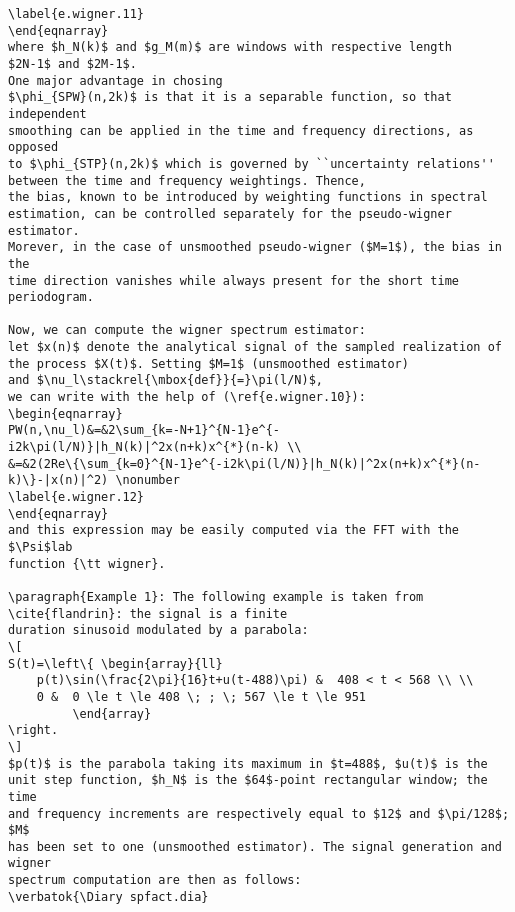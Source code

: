 {\begin{verbatim}
\label{e.wigner.11}
\end{eqnarray}
where $h_N(k)$ and $g_M(m)$ are windows with respective length 
$2N-1$ and $2M-1$.
One major advantage in chosing 
$\phi_{SPW}(n,2k)$ is that it is a separable function, so that independent 
smoothing can be applied in the time and frequency directions, as opposed 
to $\phi_{STP}(n,2k)$ which is governed by ``uncertainty relations'' 
between the time and frequency weightings. Thence, 
the bias, known to be introduced by weighting functions in spectral 
estimation, can be controlled separately for the pseudo-wigner estimator. 
Morever, in the case of unsmoothed pseudo-wigner ($M=1$), the bias in the 
time direction vanishes while always present for the short time periodogram. 

Now, we can compute the wigner spectrum estimator:
let $x(n)$ denote the analytical signal of the sampled realization of 
the process $X(t)$. Setting $M=1$ (unsmoothed estimator) 
and $\nu_l\stackrel{\mbox{def}}{=}\pi(l/N)$, 
we can write with the help of (\ref{e.wigner.10}): 
\begin{eqnarray}
PW(n,\nu_l)&=&2\sum_{k=-N+1}^{N-1}e^{-i2k\pi(l/N)}|h_N(k)|^2x(n+k)x^{*}(n-k) \\
&=&2(2Re\{\sum_{k=0}^{N-1}e^{-i2k\pi(l/N)}|h_N(k)|^2x(n+k)x^{*}(n-k)\}-|x(n)|^2) \nonumber
\label{e.wigner.12}
\end{eqnarray}
and this expression may be easily computed via the FFT with the $\Psi$lab 
function {\tt wigner}.

\paragraph{Example 1}: The following example is taken from \cite{flandrin}: the signal is a finite 
duration sinusoid modulated by a parabola:
\[
S(t)=\left\{ \begin{array}{ll}
	p(t)\sin(\frac{2\pi}{16}t+u(t-488)\pi) &  408 < t < 568 \\ \\
	0 &  0 \le t \le 408 \; ; \; 567 \le t \le 951
	     \end{array}
\right.
\]
$p(t)$ is the parabola taking its maximum in $t=488$, $u(t)$ is the 
unit step function, $h_N$ is the $64$-point rectangular window; the time 
and frequency increments are respectively equal to $12$ and $\pi/128$; $M$ 
has been set to one (unsmoothed estimator). The signal generation and wigner 
spectrum computation are then as follows:
\verbatok{\Diary spfact.dia}
\end{verbatim}


}
